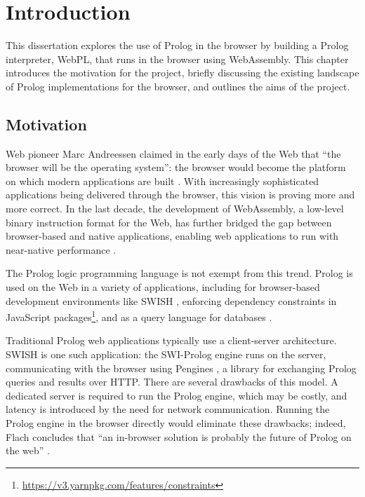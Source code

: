\chapter{Introduction}

This dissertation explores the use of Prolog in the browser by building a Prolog interpreter, WebPL, that runs in the browser using WebAssembly. This chapter introduces the motivation for the project, briefly discussing the existing landscape of Prolog implementations for the browser, and outlines the aims of the project.

\section{Motivation}

\label{sec:motivation}

Web pioneer Marc Andreessen claimed in the early days of the Web that ``the browser will be the operating system'': the browser would become the platform on which modern applications are built \cite{kosnerAlwaysEarlyMarc2012}. With increasingly sophisticated applications being delivered through the browser, this vision is proving more and more correct. In the last decade, the development of WebAssembly, a low-level binary instruction format for the Web, has further bridged the gap between browser-based and native applications, enabling web applications to run with near-native performance \cite{haasBringingwebspeed2017}.

The Prolog logic programming language is not exempt from this trend. Prolog is used on the Web in a variety of applications, including for browser-based development environments like SWISH \cite{wielemakerSWISHSWIPrologSharing2015}, enforcing dependency constraints in JavaScript packages\footnote{\url{https://v3.yarnpkg.com/features/constraints}}, and as a query language for databases \cite{wielemakerUsingPrologFundament2007}.

Traditional Prolog web applications typically use a client-server architecture. SWISH is one such application: the SWI-Prolog engine runs on the server, communicating with the browser using Pengines \cite{lagerPenginesWebLogic2014}, a library for exchanging Prolog queries and results over HTTP. There are several drawbacks of this model. A dedicated server is required to run the Prolog engine, which may be costly, and latency is introduced by the need for network communication. Running the Prolog engine in the browser directly would eliminate these drawbacks; indeed, Flach concludes that ``an in-browser solution is probably the future of Prolog on the web'' \cite{flachSimplyLogicalFirst2023}.

